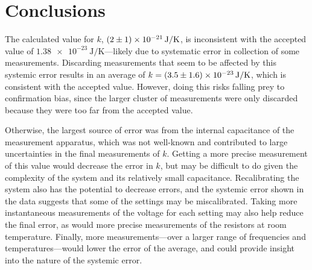\documentclass[%
 reprint,
superscriptaddress,
 amsmath,amssymb,
 aps,
]{revtex4-1}
\begin{document}
\section{Conclusions}

The calculated value for $k$, $\SI{2\pm1e-21}{\joule/\kelvin}$, is inconsistent with the accepted value of $\SI{1.38e-23}{\joule/\kelvin}$---likely due to systematic error in collection of some measurements. Discarding measurements that seem to be affected by this systemic error results in an average of $k=\SI{3.5\pm1.6e-23}{\joule/\kelvin}$, which is consistent with the accepted value. However, doing this risks falling prey to confirmation bias, since the larger cluster of measurements were only discarded because they were too far from the accepted value.

Otherwise, the largest source of error was from the internal capacitance of the measurement apparatus, which was not well-known and contributed to large uncertainties in the final measurements of $k$. Getting a more precise measurement of this value would decrease the error in $k$, but may be difficult to do given the complexity of the system and its relatively small capacitance. Recalibrating the system also has the potential to decrease errors, and the systemic error shown in the data suggests that some of the settings may be miscalibrated. Taking more instantaneous measurements of the voltage for each setting may also help reduce the final error, as would more precise measurements of the resistors at room temperature. Finally, more measurements---over a larger range of frequencies and temperatures---would lower the error of the average, and could provide insight into the nature of the systemic error.
\end{document}
